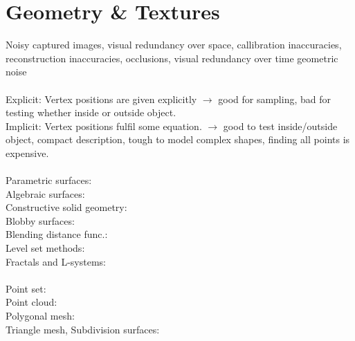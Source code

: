 \section{Geometry \& Textures}
 Noisy captured images, visual redundancy over space, callibration inaccuracies, reconstruction inaccuracies, occlusions, visual redundancy over time geometric noise \\
 \\
Explicit: Vertex positions are given explicitly $\rightarrow$ good for sampling, bad for testing whether inside or outside object.\\
Implicit: Vertex positions fulfil some equation. $\rightarrow$ good to test inside/outside object, compact description, tough to model complex shapes, finding all points is expensive.\\
\\
    Parametric surfaces: \\
    Algebraic surfaces: \\
    Constructive solid geometry: \\
    Blobby surfaces: \\
    Blending distance func.: \\
    Level set methods: \\
    Fractals and L-systems: \\
\\
    Point set: \\
    Point cloud: \\
    Polygonal mesh: \\
    Triangle mesh, Subdivision surfaces: 

